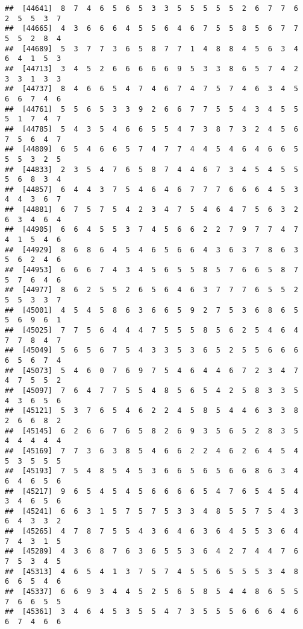 \documentclass[
]{book}
\begin{document}
\begin{verbatim}
##  [44641]  8  7  4  6  5  6  5  3  3  5  5  5  5  5  2  6  7  7  6  2  5  5  3  7
##  [44665]  4  3  6  6  6  4  5  5  6  4  6  7  5  5  8  5  6  7  7  5  5  2  8  4
##  [44689]  5  3  7  7  3  6  5  8  7  7  1  4  8  8  4  5  6  3  4  6  4  1  5  3
##  [44713]  3  4  5  2  6  6  6  6  6  9  5  3  3  8  6  5  7  4  2  3  3  1  3  3
##  [44737]  8  4  6  6  5  4  7  4  6  7  4  7  5  7  4  6  3  4  5  6  6  7  4  6
##  [44761]  5  5  6  5  3  3  9  2  6  6  7  7  5  5  4  3  4  5  5  5  1  7  4  7
##  [44785]  5  4  3  5  4  6  6  5  5  4  7  3  8  7  3  2  4  5  6  7  5  6  4  7
##  [44809]  6  5  4  6  6  5  7  4  7  7  4  4  5  4  6  4  6  6  5  5  5  3  2  5
##  [44833]  2  3  5  4  7  6  5  8  7  4  4  6  7  3  4  5  4  5  5  5  6  8  3  4
##  [44857]  6  4  4  3  7  5  4  6  4  6  7  7  7  6  6  6  4  5  3  4  4  3  6  7
##  [44881]  6  7  5  7  5  4  2  3  4  7  5  4  6  4  7  5  6  3  2  6  3  4  6  4
##  [44905]  6  6  4  5  5  3  7  4  5  6  6  2  2  7  9  7  7  4  7  4  1  5  4  6
##  [44929]  8  6  8  6  4  5  4  6  5  6  6  4  3  6  3  7  8  6  3  5  6  2  4  6
##  [44953]  6  6  6  7  4  3  4  5  6  5  5  8  5  7  6  6  5  8  7  5  7  6  4  6
##  [44977]  8  6  2  5  5  2  6  5  6  4  6  3  7  7  7  6  5  5  2  5  5  3  3  7
##  [45001]  4  5  4  5  8  6  3  6  6  5  9  2  7  5  3  6  8  6  5  5  6  9  6  1
##  [45025]  7  7  5  6  4  4  4  7  5  5  5  8  5  6  2  5  4  6  4  7  7  8  4  7
##  [45049]  5  6  5  6  7  5  4  3  3  5  3  6  5  2  5  5  6  6  6  6  5  6  7  4
##  [45073]  5  4  6  0  7  6  9  7  5  4  6  4  4  6  7  2  3  4  7  4  7  5  5  2
##  [45097]  7  6  4  7  7  5  5  4  8  5  6  5  4  2  5  8  3  3  5  4  3  6  5  6
##  [45121]  5  3  7  6  5  4  6  2  2  4  5  8  5  4  4  6  3  3  8  2  6  6  8  2
##  [45145]  6  2  6  6  7  6  5  8  2  6  9  3  5  6  5  2  8  3  5  4  4  4  4  4
##  [45169]  7  7  3  6  3  8  5  4  6  6  2  2  4  6  2  6  4  5  4  5  3  5  5  5
##  [45193]  7  5  4  8  5  4  5  3  6  6  5  6  5  6  6  8  6  3  4  6  4  6  5  6
##  [45217]  9  6  5  4  5  4  5  6  6  6  6  5  4  7  6  5  4  5  4  3  4  6  5  6
##  [45241]  6  6  3  1  5  7  5  7  5  3  3  4  8  5  5  7  5  4  3  6  4  3  3  2
##  [45265]  4  7  8  7  5  5  4  3  6  4  6  3  6  4  5  5  3  6  4  7  4  3  1  5
##  [45289]  4  3  6  8  7  6  3  6  5  5  3  6  4  2  7  4  4  7  6  7  5  3  4  5
##  [45313]  4  6  5  4  1  3  7  5  7  4  5  5  6  5  5  5  3  4  8  6  6  5  4  6
##  [45337]  6  6  9  3  4  4  5  2  5  6  5  8  5  4  4  8  6  5  5  7  6  6  5  5
##  [45361]  3  4  6  4  5  3  5  5  4  7  3  5  5  5  6  6  6  4  6  6  7  4  6  6

\end{verbatim}
\end{document}
